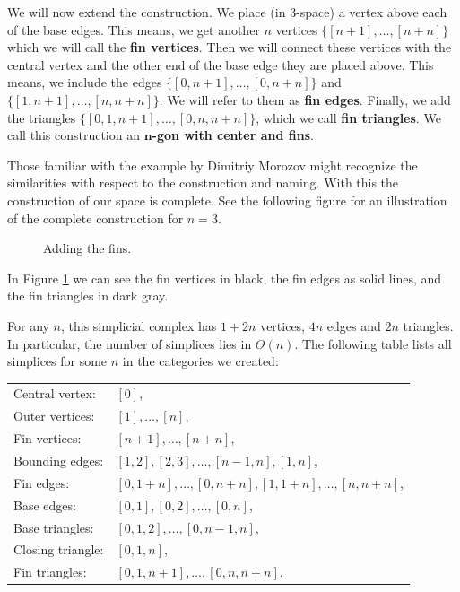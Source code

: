 We will now extend the construction. We place (in $3$-space) a vertex above each of the base edges. This means, we get another $n$ vertices $\{[n+1], \dots , [n+n]\}$ which we will call the \textbf{fin vertices}. Then we will connect these vertices with the central vertex and the other end of the base edge they are placed above. This means, we include the edges $\{[0,n+1], \dots, [0,n+n]\}$ and $\{[1,n+1], \dots, [n,n+n]\}$. We will refer to them as \textbf{fin edges}. Finally, we add the triangles $\{[0,1,n+1], \dots ,[0,n,n+n]\}$, which we call  \textbf{fin triangles}. We call this construction an $\bm{n}$\textbf{-gon with center and fins}.

Those familiar with the example by Dimitriy Morozov might recognize the similarities with respect to the construction and naming. With this the construction of our space is complete. See the following figure for an illustration of the complete construction for $n = 3$.

\begin{figure}[H]
\noindent%
\centering%

\caption{Adding the fins.}
\label{fig:fin_pizza_complete}
\end{figure}

In Figure \ref{fig:fin_pizza_complete} we can see the fin vertices in black, the fin edges as solid lines, and the fin triangles in dark gray. 

For any $n$, this simplicial complex has $1+2n$ vertices, $4n$ edges and $2n$ triangles. In particular, the number of simplices lies in $\Theta(n)$. The following table lists all simplices for some $n$ in the categories we created:
\begin{center}
    \begin{tabular}{ll}
        Central vertex: & $[0]$, \\
        Outer vertices: & $[1],\dots,[n]$, \\
        Fin vertices: & $[n+1],\dots,[n+n]$, \\
        Bounding edges: & $[1,2],[2,3],\dots,[n-1,n],[1,n]$,\\
        Fin edges: & $[0,1+n],\dots,[0,n+n],[1,1+n],\dots,[n,n+n]$,\\
        Base edges: & $[0,1],[0,2], \dots, [0,n]$, \\
        Base triangles: & $[0,1,2],\dots,[0,n-1,n]$,\\
        Closing triangle: & $[0,1,n]$, \\
        Fin triangles: & $[0,1,n+1],\dots,[0,n,n+n]$.
    \end{tabular}
\end{center}


